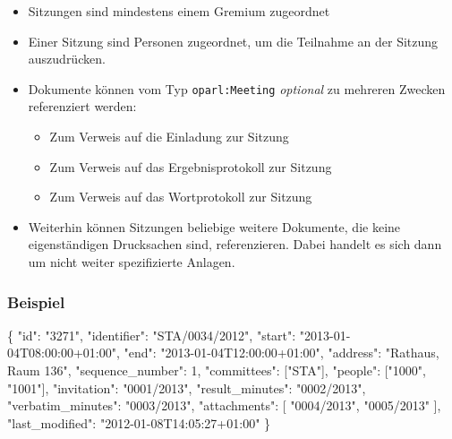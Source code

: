 \documentclass[,a4paper]{article}
\newenvironment{Shaded}{}{}
\newcommand{\DataTypeTok}[1]{\textcolor[rgb]{0.56,0.13,0.00}{{#1}}}
\newcommand{\DecValTok}[1]{\textcolor[rgb]{0.25,0.63,0.44}{{#1}}}
\newcommand{\StringTok}[1]{\textcolor[rgb]{0.25,0.44,0.63}{{#1}}}
\newcommand{\NormalTok}[1]{{#1}}
\begin{document}
\begin{itemize}
\itemsep1pt\parskip0pt
\item
  Sitzungen sind mindestens einem Gremium zugeordnet
\item
  Einer Sitzung sind Personen zugeordnet, um die Teilnahme an der
  Sitzung auszudrücken.
\item
  Dokumente können vom Typ \texttt{oparl:Meeting} \emph{optional} zu
  mehreren Zwecken referenziert werden:

  \begin{itemize}
  \itemsep1pt\parskip0pt
  \item
    Zum Verweis auf die Einladung zur Sitzung
  \item
    Zum Verweis auf das Ergebnisprotokoll zur Sitzung
  \item
    Zum Verweis auf das Wortprotokoll zur Sitzung
  \end{itemize}
\item
  Weiterhin können Sitzungen beliebige weitere Dokumente, die keine
  eigenständigen Drucksachen sind, referenzieren. Dabei handelt es sich
  dann um nicht weiter spezifizierte Anlagen.
\end{itemize}

\subsubsection{Beispiel}\label{beispiel-4}

\begin{Shaded}
\begin{Highlighting}[]
\NormalTok{\{}
    \DataTypeTok{"id"}\NormalTok{: }\StringTok{"3271"}\NormalTok{,}
    \DataTypeTok{"identifier"}\NormalTok{: }\StringTok{"STA/0034/2012"}\NormalTok{,}
    \DataTypeTok{"start"}\NormalTok{: }\StringTok{"2013-01-04T08:00:00+01:00"}\NormalTok{,}
    \DataTypeTok{"end"}\NormalTok{: }\StringTok{"2013-01-04T12:00:00+01:00"}\NormalTok{,}
    \DataTypeTok{"address"}\NormalTok{: }\StringTok{"Rathaus, Raum 136"}\NormalTok{,}
    \DataTypeTok{"sequence_number"}\NormalTok{: }\DecValTok{1}\NormalTok{,}
    \DataTypeTok{"committees"}\NormalTok{: [}\StringTok{"STA"}\NormalTok{],}
    \DataTypeTok{"people"}\NormalTok{: [}\StringTok{"1000"}\NormalTok{, }\StringTok{"1001"}\NormalTok{],}
    \DataTypeTok{"invitation"}\NormalTok{: }\StringTok{"0001/2013"}\NormalTok{,}
    \DataTypeTok{"result_minutes"}\NormalTok{: }\StringTok{"0002/2013"}\NormalTok{,}
    \DataTypeTok{"verbatim_minutes"}\NormalTok{: }\StringTok{"0003/2013"}\NormalTok{,}
    \DataTypeTok{"attachments"}\NormalTok{: [}
        \StringTok{"0004/2013"}\NormalTok{,}
        \StringTok{"0005/2013"}
    \NormalTok{],}
    \DataTypeTok{"last_modified"}\NormalTok{: }\StringTok{"2012-01-08T14:05:27+01:00"}
\NormalTok{\}}
\end{Highlighting}
\end{Shaded}
\end{document}

